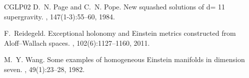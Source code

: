 \documentclass[11pt,letterpaper]{amsart}
\theoremstyle{definition}
\numberwithin{equation}{section}
\begin{document}
\begin{thebibliography}{CGLP02}
D.~N. Page and C.~N. Pope.
\newblock New squashed solutions of d= 11 supergravity.
, 147(1-3):55--60, 1984.

F.~Reidegeld.
\newblock Exceptional holonomy and {E}instein metrics constructed from
  {A}loff--{W}allach spaces.
,
  102(6):1127--1160, 2011.

M.~Y. Wang.
\newblock Some examples of homogeneous {E}instein manifolds in dimension seven.
, 49(1):23--28, 1982.
\end{thebibliography}
\end{document}
